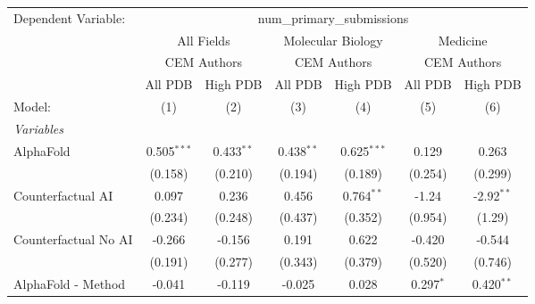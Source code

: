 \begingroup
\centering
\begin{tabular}{lcccccc}
   \tabularnewline \midrule \midrule
   Dependent Variable: & \multicolumn{6}{c}{num\_primary\_submissions}\\
 & \multicolumn{2}{c}{All Fields} & \multicolumn{2}{c}{Molecular Biology} & \multicolumn{2}{c}{Medicine} \\
\cmidrule(lr){2-3} \cmidrule(lr){4-5} \cmidrule(lr){6-7}
 & \multicolumn{2}{c}{CEM Authors} & \multicolumn{2}{c}{CEM Authors} & \multicolumn{2}{c}{CEM Authors} \\
\cmidrule(lr){2-3} \cmidrule(lr){4-5} \cmidrule(lr){6-7}
 & \multicolumn{1}{c}{All PDB} & \multicolumn{1}{c}{High PDB} & \multicolumn{1}{c}{All PDB} & \multicolumn{1}{c}{High PDB} & \multicolumn{1}{c}{All PDB} & \multicolumn{1}{c}{High PDB} \\
\cmidrule(lr){2-2} \cmidrule(lr){3-3} \cmidrule(lr){4-4} \cmidrule(lr){5-5} \cmidrule(lr){6-6} \cmidrule(lr){7-7}
   Model:                                                     & (1)           & (2)           & (3)          & (4)           & (5)          & (6)\\  
   \midrule
   \emph{Variables}\\
   AlphaFold                                                  & 0.505$^{***}$ & 0.433$^{**}$  & 0.438$^{**}$ & 0.625$^{***}$ & 0.129        & 0.263\\   
                                                              & (0.158)       & (0.210)       & (0.194)      & (0.189)       & (0.254)      & (0.299)\\   
   Counterfactual AI                                          & 0.097         & 0.236         & 0.456        & 0.764$^{**}$  & -1.24        & -2.92$^{**}$\\   
                                                              & (0.234)       & (0.248)       & (0.437)      & (0.352)       & (0.954)      & (1.29)\\   
   Counterfactual No AI                                       & -0.266        & -0.156        & 0.191        & 0.622         & -0.420       & -0.544\\   
                                                              & (0.191)       & (0.277)       & (0.343)      & (0.379)       & (0.520)      & (0.746)\\   
   AlphaFold - Method                                         & -0.041        & -0.119        & -0.025       & 0.028         & 0.297$^{*}$  & 0.420$^{**}$\\   

\end{tabular}
